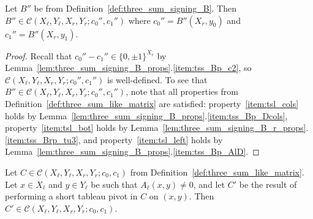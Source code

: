 \begin{lemma}\label{lem:three_sum_like_signing_B}
    Let $B''$ be from Definition~\ref{def:three_sum_signing_B}. Then $B'' \in \mathcal{C} (X_{\ell}, Y_{\ell}, X_{r}, Y_{r}; c_{0}'', c_{1}'')$ where $c_{0}'' = B'' (X_{r}, y_{0})$ and $c_{1}'' = B'' (X_{r}, y_{1})$.
\end{lemma}

\begin{proof}
    Recall that $c_{0}'' - c_{1}'' \in \{0, \pm 1\}^{X_{r}}$ by Lemma~\ref{lem:three_sum_signing_B_props}.\ref{item:tss_Bp_c2}, so $\mathcal{C} (X_{\ell}, Y_{\ell}, X_{r}, Y_{r}; c_{0}'', c_{1}'')$ is well-defined. To see that $B'' \in \mathcal{C} (X_{\ell}, Y_{\ell}, X_{r}, Y_{r}; c_{0}'', c_{1}'')$, note that all properties from Definition~\ref{def:three_sum_like_matrix} are satisfied: property~\ref{item:tsl_cols} holds by Lemma~\ref{lem:three_sum_signing_B_props}.\ref{item:tss_Bp_Dcols}, property~\ref{item:tsl_bot} holds by Lemma~\ref{lem:three_sum_signing_B_r_props}.\ref{item:tss_Brp_tu3}, and property~\ref{item:tsl_left} holds by Lemma~\ref{lem:three_sum_signing_B_props}.\ref{item:tss_Bp_AlD}.
\end{proof}

\begin{lemma}\label{lem:three_sum_like_pivot}
    Let $C \in \mathcal{C} (X_{\ell}, Y_{\ell}, X_{r}, Y_{r}; c_{0}, c_{1})$ from Definition~\ref{def:three_sum_like_matrix}. Let $x \in X_{\ell}$ and $y \in Y_{\ell}$ be such that $A_{\ell} (x, y) \neq 0$, and let $C'$ be the result of performing a short tableau pivot in $C$ on $(x, y)$. Then $C' \in \mathcal{C} (X_{\ell}, Y_{\ell}, X_{r}, Y_{r}; c_{0}, c_{1})$.
\end{lemma}

